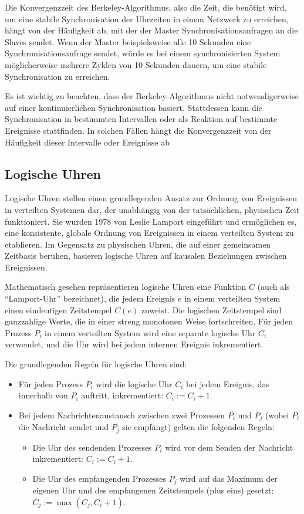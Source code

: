 Die Konvergenzzeit des Berkeley-Algorithmus, also die Zeit, die benötigt wird, um eine stabile Synchronisation der Uhrzeiten in einem Netzwerk zu erreichen, hängt von der Häufigkeit ab, mit der der Master Synchronisationsanfragen an die Slaves sendet. Wenn der Master beispielsweise alle 10 Sekunden eine Synchronisationsanfrage sendet, würde es bei einem synchronisierten System möglicherweise mehrere Zyklen von 10 Sekunden dauern, um eine stabile Synchronisation zu erreichen. 

Es ist wichtig zu beachten, dass der Berkeley-Algorithmus nicht notwendigerweise auf einer kontinuierlichen Synchronisation basiert. Stattdessen kann die Synchronisation in bestimmten Intervallen oder als Reaktion auf bestimmte Ereignisse stattfinden. In solchen Fällen hängt die Konvergenzzeit von der Häufigkeit dieser Intervalle oder Ereignisse ab

\subsection{Logische Uhren}
Logische Uhren stellen einen grundlegenden Ansatz zur Ordnung von Ereignissen in verteilten Systemen dar, der unabhängig von der tatsächlichen, physischen Zeit funktioniert. Sie wurden 1978 von Leslie Lamport eingeführt und ermöglichen es, eine konsistente, globale Ordnung von Ereignissen in einem verteilten System zu etablieren. Im Gegensatz zu physischen Uhren, die auf einer gemeinsamen Zeitbasis beruhen, basieren logische Uhren auf kausalen Beziehungen zwischen Ereignissen.

Mathematisch gesehen repräsentieren logische Uhren eine Funktion $C$ (auch als \enquote{Lamport-Uhr} bezeichnet), die jedem Ereignis $e$ in einem verteilten System einen eindeutigen Zeitstempel $C(e)$ zuweist. Die logischen Zeitstempel sind ganzzahlige Werte, die in einer streng monotonen Weise fortschreiten. Für jeden Prozess $P_i$ in einem verteilten System wird eine separate logische Uhr $C_i$ verwendet, und die Uhr wird bei jedem internen Ereignis inkrementiert.

Die grundlegenden Regeln für logische Uhren sind:
\begin{itemize}
\item Für jeden Prozess $P_i$ wird die logische Uhr $C_i$ bei jedem Ereignis, das innerhalb von $P_i$ auftritt, inkrementiert: $C_i := C_i + 1$.
\item Bei jedem Nachrichtenaustausch zwischen zwei Prozessen $P_i$ und $P_j$ (wobei $P_i$ die Nachricht sendet und $P_j$ sie empfängt) gelten die folgenden Regeln:
\begin{itemize}
\item Die Uhr des sendenden Prozesses $P_i$ wird vor dem Senden der Nachricht inkrementiert: $C_i := C_i + 1$.
\item Die Uhr des empfangenden Prozesses $P_j$ wird auf das Maximum der eigenen Uhr und des empfangenen Zeitstempels (plus eins) gesetzt: $C_j := \max(C_j, C_i + 1)$.
\end{itemize}    
\end{itemize}

